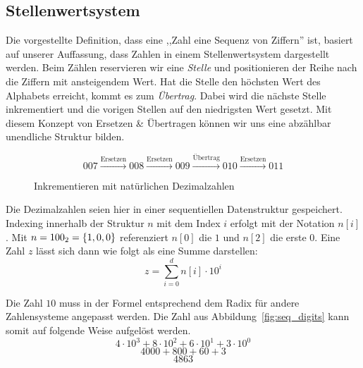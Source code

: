 \subsection{Stellenwertsystem}
%
Die vorgestellte Definition, dass eine ,,Zahl eine Sequenz von Ziffern'' ist,
basiert auf unserer Auffassung, dass Zahlen in einem Stellenwertsystem
dargestellt werden. Beim Zählen reservieren wir eine \emph{Stelle} und
positionieren der Reihe nach die Ziffern mit ansteigendem Wert.
Hat die Stelle den höchsten Wert des Alphabets erreicht,
kommt es zum \emph{Übertrag}. Dabei wird die nächste Stelle inkrementiert
und die vorigen Stellen auf den niedrigsten Wert gesetzt.
Mit diesem Konzept von Ersetzen \& Übertragen
können wir uns eine abzählbar unendliche Struktur bilden.
%
\begin{figure}[ht]
  \begin{displaymath}
    007 \xrightarrow{\text{Ersetzen}} 008 \xrightarrow{\text{Ersetzen}}
    009 \xrightarrow{\text{Übertrag}} 010 \xrightarrow{\text{Ersetzen}}
    011
  \end{displaymath}

  \caption{Inkrementieren mit natürlichen Dezimalzahlen}
\end{figure}

Die Dezimalzahlen seien hier in einer sequentiellen Datenstruktur gespeichert.
Indexing innerhalb der Struktur $n$ mit dem Index $i$ erfolgt mit der Notation
$n[i]$. Mit $n = 100_2 = \left\{1, 0, 0\right\}$ referenziert $n[0]$ die $1$ und
$n[2]$ die erste $0$. Eine Zahl $z$ lässt sich dann wie folgt als eine Summe
darstellen:
\[
  z = \sum_{i=0}^d n[i] \cdot 10^i
\]

Die Zahl $10$ muss in der Formel entsprechend dem Radix für andere
Zahlensysteme angepasst werden. Die Zahl aus Abbildung~\ref{fig:seq_digits}
kann somit auf folgende Weise aufgelöst werden.
\[
  4\cdot10^3 + 8\cdot10^2 + 6\cdot10^1 + 3\cdot10^0
\] \[
  4000 + 800 + 60 + 3
\] \[
  4863
\]


